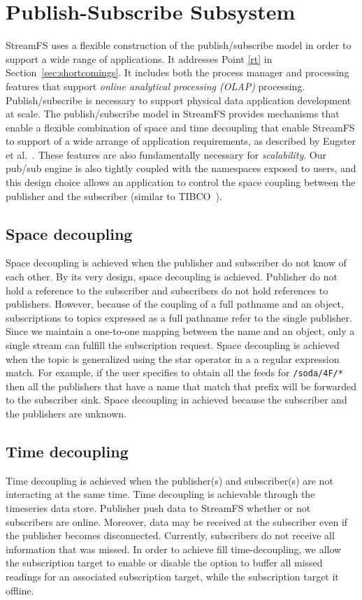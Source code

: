 \section{Publish-Subscribe Subsystem}
\label{sec:ProcMngtSchedMain}

StreamFS uses a flexible construction of the publish/subscribe model in order to support a wide range of applications.
It addresses Point \ref{rt} in Section~\ref{sec:shortcomings}.  It includes both the process manager and processing
features that support \emph{online analytical processing (OLAP)} processing.
Publish/subscribe is necessary to support physical data application development at scale.
The publish/subscribe model in StreamFS provides mechanisms that enable a flexible combination 
of space and time decoupling that enable StreamFS to support of a wide arrange of application requirements, as described by
Eugster et al.~\cite{eugster}.  These features are also fundamentally necessary for \emph{scalability}.
Our pub/sub engine is also tightly coupled with the namespaces exposed to users, and this design choice allows an application
to control the space coupling between the publisher and the subscriber (similar to TIBCO~\cite{tibco}).  

\subsection{Space decoupling}
Space decoupling is achieved when the publisher and subscriber do not know of each other.
By its very design, space decoupling is achieved.  Publisher do not hold a reference to the subscriber and subscribers do not
hold references to publishers.  However, because of the coupling of a full pathname and an object, subscriptions to topics
expressed as a full pathname refer to the single publisher.  Since we maintain a one-to-one mapping between the
name and an object, only a single stream can fulfill the subscription request.  Space decoupling is achieved when the 
topic is generalized using the star operator in a a regular expression match.  For example, if the user specifies
to obtain all the feeds for \texttt{/soda/4F/*} then all the publishers that have a name that match that prefix will be forwarded
to the subscriber sink.  Space decoupling in achieved because the subscriber and the publishers are unknown.

\subsection{Time decoupling}
Time decoupling is achieved when the publisher(s) and subscriber(s) are not interacting at the same time.
Time decoupling is achievable through the timeseries data store.  Publisher push data to StreamFS whether or not subscribers are
online.  Moreover, data may be received at the subscriber even if the publisher becomes disconnected.  Currently, subscribers do
not receive all information that was missed.  In order to achieve fill time-decoupling, we allow the subscription
target to enable or disable the option to buffer all missed readings for an associated subscription target, while the subscription
target it offline.

